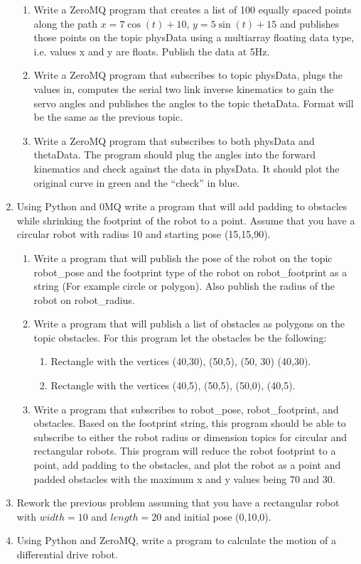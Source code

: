 \begin{enumerate}
  \begin{enumerate}
  \tightlist
  \item
    Write a ZeroMQ program that creates a list of 100 equally spaced
    points along the path \(x = 7\cos(t)+10\), \(y = 5\sin(t) + 15\) and
    publishes those points on the topic {physData} using a multiarray
    floating data type, i.e. values x and y are floats. Publish the data
    at 5Hz.
  \item
    Write a ZeroMQ program that subscribes to topic {physData}, plugs
    the values in, computes the serial two link inverse kinematics to
    gain the servo angles and publishes the angles to the topic
    {thetaData}. Format will be the same as the previous topic.
  \item
    Write a ZeroMQ program that subscribes to both {physData} and
    {thetaData}. The program should plug the angles into the forward
    kinematics and check against the data in {physData}. It should plot
    the original curve in green and the ``check'' in blue.
  \end{enumerate}
\item
  Using Python and 0MQ write a program that will add padding to
  obstacles while shrinking the footprint of the robot to a point.
  Assume that you have a circular robot with radius 10 and starting pose
  (15,15,90).

  \begin{enumerate}
  \tightlist
  \item
    Write a program that will publish the pose of the robot on the topic
    {robot\_pose} and the footprint type of the robot on
    {robot\_footprint} as a string (For example circle or polygon). Also
    publish the radius of the robot on {robot\_radius}.
  \item
    Write a program that will publish a list of obstacles as polygons on
    the topic {obstacles}. For this program let the obstacles be the
    following:

    \begin{enumerate}
    \tightlist
    \item
      Rectangle with the vertices (40,30), (50,5), (50, 30) (40,30).
    \item
      Rectangle with the vertices (40,5), (50,5), (50,0), (40,5).
    \end{enumerate}
  \item
    Write a program that subscribes to {robot\_pose},
    {robot\_footprint}, and {obstacles}. Based on the footprint string,
    this program should be able to subscribe to either the robot radius
    or dimension topics for circular and rectangular robots. This
    program will reduce the robot footprint to a point, add padding to
    the obstacles, and plot the robot as a point and padded obstacles
    with the maximum x and y values being 70 and 30.
  \end{enumerate}
\item
  Rework the previous problem assuming that you have a rectangular robot
  with \(width=10\) and \(length=20\) and initial pose (0,10,0).
\item
  Using Python and ZeroMQ, write a program to calculate the motion of a
  differential drive robot.


\end{enumerate}

